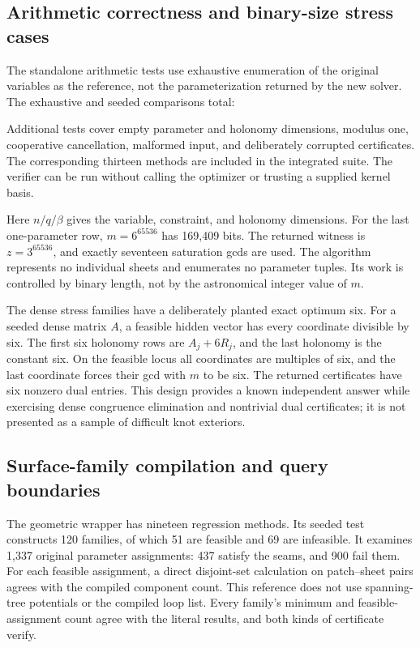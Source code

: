 \subsection{Arithmetic correctness and binary-size stress cases}

The standalone arithmetic tests use exhaustive enumeration of the original
variables as the reference, not the parameterization returned by the new
solver. The exhaustive and seeded comparisons total:



Additional tests cover empty parameter and holonomy dimensions, modulus one,
cooperative cancellation, malformed input, and deliberately corrupted
certificates. The corresponding thirteen  methods are
included in the integrated suite. The verifier can be run without calling
the optimizer or trusting a supplied kernel basis.



Here $n/q/\beta$ gives the variable, constraint, and holonomy dimensions.
For the last one-parameter row, $m=6^{65536}$ has 169,409 bits. The returned
witness is $z=3^{65536}$, and exactly seventeen saturation gcds are used.
The algorithm represents no individual sheets and enumerates no parameter
tuples. Its work is controlled by binary length, not by the astronomical
integer value of $m$.

The dense stress families have a deliberately planted exact optimum six.
For a seeded dense matrix $A$, a feasible hidden vector has every coordinate
divisible by six. The first six holonomy rows are $A_j+6R_j$, and the last
holonomy is the constant six. On the feasible locus all coordinates are
multiples of six, and the last coordinate forces their gcd with $m$ to be
six. The returned certificates have six nonzero dual entries. This design
provides a known independent answer while exercising dense congruence
elimination and nontrivial dual certificates; it is not presented as a
sample of difficult knot exteriors.

\subsection{Surface-family compilation and query boundaries}

The geometric wrapper has nineteen regression methods. Its seeded test
constructs 120 families, of which 51 are feasible and 69 are infeasible.
It examines 1,337 original parameter assignments: 437 satisfy the seams,
and 900 fail them. For each feasible assignment, a direct disjoint-set
calculation on patch--sheet pairs agrees with the compiled component count.
This reference does not use spanning-tree potentials or the compiled loop
list. Every family's minimum and feasible-assignment count agree with the
literal results, and both kinds of certificate verify.

